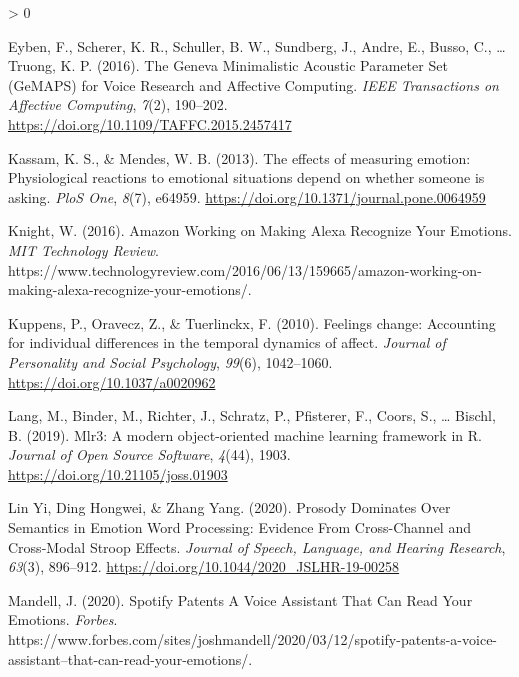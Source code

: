 \documentclass[
  english,
  man,floatsintext]{apa6}
\newlength{\cslhangindent}
\newenvironment{CSLReferences}[2] %
 {%
  \setlength{\parindent}{0pt}
  \ifodd #1 \everypar{\setlength{\hangindent}{\cslhangindent}}\ignorespaces\fi
  \ifnum #2 > 0
  \setlength{\parskip}{#2\baselineskip}
  \fi
 }%
 {}
\begin{document}
\begin{CSLReferences}{1}{0}
\leavevmode\hypertarget{ref-eybenGenevaMinimalisticAcoustic2016}{}%
Eyben, F., Scherer, K. R., Schuller, B. W., Sundberg, J., Andre, E., Busso, C., \ldots{} Truong, K. P. (2016). The {Geneva Minimalistic Acoustic Parameter Set} ({GeMAPS}) for {Voice Research} and {Affective Computing}. \emph{IEEE Transactions on Affective Computing}, \emph{7}(2), 190--202. \url{https://doi.org/10.1109/TAFFC.2015.2457417}

\leavevmode\hypertarget{ref-kassamEffectsMeasuringEmotion2013}{}%
Kassam, K. S., \& Mendes, W. B. (2013). The effects of measuring emotion: Physiological reactions to emotional situations depend on whether someone is asking. \emph{PloS One}, \emph{8}(7), e64959. \url{https://doi.org/10.1371/journal.pone.0064959}

\leavevmode\hypertarget{ref-knightAmazonWorkingMaking2016a}{}%
Knight, W. (2016). Amazon {Working} on {Making Alexa Recognize Your Emotions}. \emph{MIT Technology Review}. https://www.technologyreview.com/2016/06/13/159665/amazon-working-on-making-alexa-recognize-your-emotions/.

\leavevmode\hypertarget{ref-kuppensFeelingsChangeAccounting2010}{}%
Kuppens, P., Oravecz, Z., \& Tuerlinckx, F. (2010). Feelings change: Accounting for individual differences in the temporal dynamics of affect. \emph{Journal of Personality and Social Psychology}, \emph{99}(6), 1042--1060. \url{https://doi.org/10.1037/a0020962}

\leavevmode\hypertarget{ref-langMlr3ModernObjectoriented2019}{}%
Lang, M., Binder, M., Richter, J., Schratz, P., Pfisterer, F., Coors, S., \ldots{} Bischl, B. (2019). Mlr3: A modern object-oriented machine learning framework in {R}. \emph{Journal of Open Source Software}, \emph{4}(44), 1903. \url{https://doi.org/10.21105/joss.01903}

\leavevmode\hypertarget{ref-linyiProsodyDominatesSemantics2020}{}%
Lin Yi, Ding Hongwei, \& Zhang Yang. (2020). Prosody {Dominates Over Semantics} in {Emotion Word Processing}: Evidence {From Cross}-{Channel} and {Cross}-{Modal Stroop Effects}. \emph{Journal of Speech, Language, and Hearing Research}, \emph{63}(3), 896--912. \url{https://doi.org/10.1044/2020_JSLHR-19-00258}

\leavevmode\hypertarget{ref-mandellSpotifyPatentsVoice2020}{}%
Mandell, J. (2020). Spotify {Patents A Voice Assistant That Can Read Your Emotions}. \emph{Forbes}. https://www.forbes.com/sites/joshmandell/2020/03/12/spotify-patents-a-voice-assistant--that-can-read-your-emotions/.


\end{CSLReferences}
\end{document}
